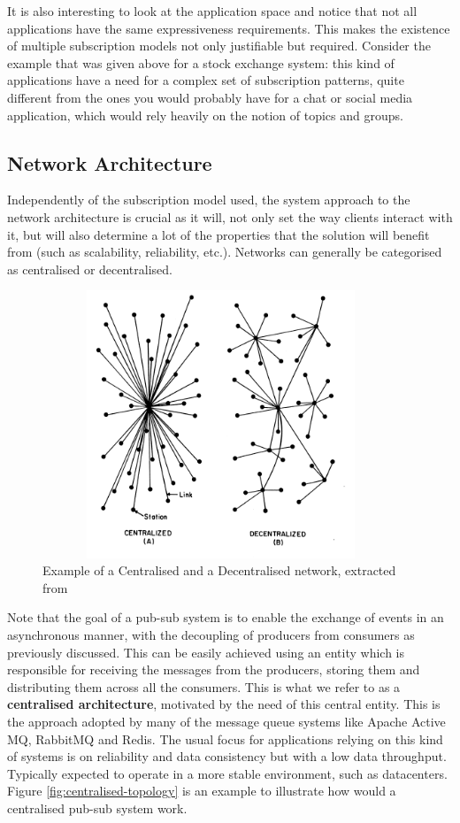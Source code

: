It is also interesting to look at the application space and notice that
not all applications have the same expressiveness requirements. This
makes the existence of multiple subscription models not only justifiable
but required. Consider the example that was given above for a stock exchange
system: this kind of applications have a need for a complex set of
subscription patterns, quite different from the ones you would probably
have for a chat or social media application, which would rely heavily on
the notion of topics and groups.

\subsection{Network Architecture}\label{network-architecture}

Independently of the subscription model used, the system approach to the
network architecture is crucial as it will, not only set the way clients
interact with it, but will also determine a lot of the properties that
the solution will benefit from (such as scalability, reliability, etc.). Networks
can generally be categorised as centralised or decentralised.

\begin{figure}[hb!]
  \centering
  \includegraphics[max height=8cm,max width=0.95\textwidth]{../images/network-archs.png}
  \caption{Example of a Centralised and a Decentralised network, extracted from \cite{Baran1964}}
  \label{fig:network-archs}
\end{figure}

Note that the goal of a pub-sub system is to enable the exchange of events in
an asynchronous manner, with the decoupling of producers from consumers as
previously discussed. This can be easily achieved using an entity which is
responsible for receiving the messages from the producers, storing them and
distributing them across all the consumers. This is what we refer to as a
\textbf{centralised architecture}, motivated by the need of this central
entity. This is the approach adopted by many of the message queue systems like
Apache Active MQ, RabbitMQ and Redis. The usual focus for applications relying
on this kind of systems is on reliability and data consistency but with a low
data throughput. Typically expected to operate in a more stable environment,
such as datacenters. Figure \ref{fig:centralised-topology} is an example to
illustrate how would a centralised pub-sub system work.

